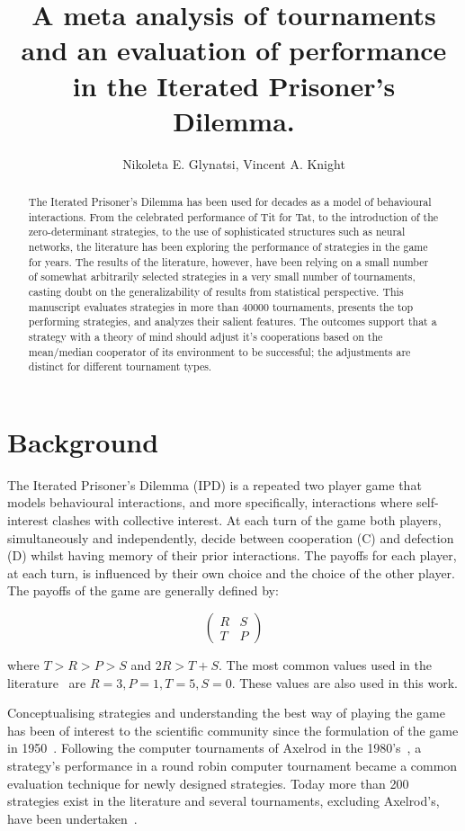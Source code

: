 \documentclass{article}
\title{A meta analysis of tournaments and an evaluation of performance in the
Iterated Prisoner's Dilemma.}
\author{Nikoleta E. Glynatsi, Vincent A. Knight}
\date{}
\newcommand{\numberofstrategies}{}
\begin{document}
\maketitle

\begin{abstract}
The Iterated Prisoner's Dilemma has been used for decades as a model of
behavioural interactions. From the celebrated performance of Tit for Tat, to the
introduction of the zero-determinant strategies, to the use of sophisticated
structures such as neural networks, the literature has been exploring the
performance of strategies in the game for years. The results of the literature,
however, have been relying on a small number of somewhat arbitrarily selected
strategies in a very small number of tournaments,
casting doubt on the generalizability of results from statistical perspective.
This manuscript evaluates \numberofstrategies strategies in more than 40000
tournaments, presents the top performing strategies, and analyzes their
salient features.
The outcomes support that a strategy with a theory of mind should adjust it’s
cooperations based on the mean/median cooperator of its environment to be
successful; the adjustments are distinct for different tournament types.
\end{abstract}

\section{Background}

The Iterated Prisoner's Dilemma (IPD) is a repeated two player game that models
behavioural interactions, and more specifically, interactions where
self-interest clashes with collective interest. At each turn of the game both
players, simultaneously and independently, decide between cooperation (C) and
defection (D) whilst having memory of their prior interactions. The payoffs for each
player, at each turn, is influenced by their own choice and the choice of the
other player. The payoffs of the game are generally defined by:

\[\begin{pmatrix}
R & S \\
T & P
\end{pmatrix}\]

where \(T > R > P > S\) and \(2R > T + S\). The most common values used in
the literature~\cite{Axelrod1981} are $R=3, P=1, T=5, S=0$. These values are also
used in this work.

Conceptualising strategies and understanding the best way of playing the game
has been of interest to the scientific community since the formulation of the
game in 1950~\cite{Flood1958}. Following the computer tournaments of Axelrod in the
1980's~\cite{Axelrod1980a, Axelrod1980b}, a strategy's performance in a round
robin computer tournament became a common evaluation technique for newly designed
strategies. Today more than 200 strategies exist in the literature and several
tournaments, excluding Axelrod's, have been undertaken~\cite{Bendor1991,
Harper2017, Kendall2007, Stephens2002, Stewart2012}.
\end{document}
